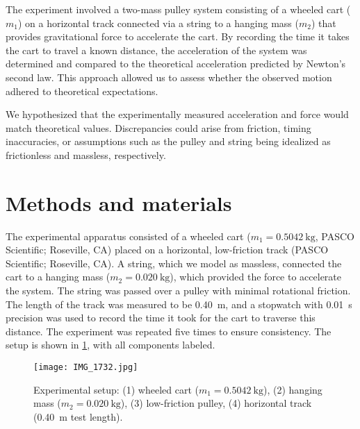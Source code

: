 \documentclass[reprint,amsmath,amssymb,aps,twoside]{revtex4-2}
\begin{document}
The experiment involved a two-mass pulley system consisting of a wheeled cart ($m_1$) on a horizontal track connected via a string to a hanging mass ($m_2$) that provides gravitational force to accelerate the cart. By recording the time it takes the cart to travel a known distance, the acceleration of the system was determined and compared to the theoretical acceleration predicted by Newton's second law. This approach allowed us to assess whether the observed motion adhered to theoretical expectations.

We hypothesized that the experimentally measured acceleration and force would match theoretical values. Discrepancies could arise from friction, timing inaccuracies, or assumptions such as the pulley and string being idealized as frictionless and massless, respectively.







\section{Methods and materials}
The experimental apparatus consisted of a wheeled cart ($m_1 = \qty{0.5042}{\kilo\gram}$, PASCO Scientific; Roseville, CA) placed on a horizontal, low-friction track (PASCO Scientific; Roseville, CA). A string, which we model as massless, connected the cart to a hanging mass ($m_2 = \qty{0.020}{\kilo\gram}$), which provided the force to accelerate the system. The string was passed over a pulley with minimal rotational friction. The length of the track was measured to be \qty{0.40}{\meter}, and a stopwatch with \qty{0.01}{\second} precision was used to record the time it took for the cart to traverse this distance. The experiment was repeated five times to ensure consistency. The setup is shown in \cref{fig:1}, with all components labeled.
\begin{figure}
\begin{center}
\texttt{[image: IMG\_1732.jpg]}
\end{center}
\caption{\label{fig:1} Experimental setup: (1) wheeled cart ($m_1=\qty{0.5042}{\kilo\gram}$), (2) hanging mass ($m_2=\qty{0.020}{\kilo\gram}$), (3) low-friction pulley, (4) horizontal track (\qty{0.40}{\meter} test length).}
\end{figure}
\end{document}
